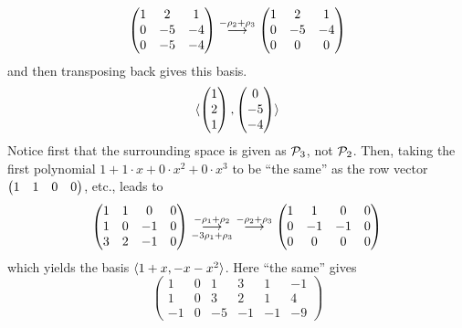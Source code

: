 \begin{exercises}
\begin{answer}
\begin{exparts}
\begin{equation*}
\begin{pmatrix}
               1  &2  &1  \\
               0  &-5 &-4 \\
               0  &-5 &-4
             \end{pmatrix}
             \grstep{-\rho_2+\rho_3}
             \begin{pmatrix}
               1  &2  &1  \\
               0  &-5 &-4 \\
               0  &0  &0
             \end{pmatrix}
          \end{equation*}
          and then transposing back gives this basis.
          \begin{equation*}
            \sequence{\colvec{1 \\ 2 \\ 1},
              \colvec{0 \\ -5 \\ -4}   }
          \end{equation*}
        \partsitem Notice first that the surrounding space is given as 
          $\polyspace_3$, not $\polyspace_2$. 
          Then, taking the first polynomial $1+1\cdot x+0\cdot x^2+0\cdot x^3$ 
          to be ``the same'' as the row vector $\rowvec{1 &1 &0 &0}$, etc., 
          leads to
          \begin{equation*}
            \begin{pmatrix}
              1  &1  &0  &0 \\
              1  &0  &-1 &0 \\
              3  &2  &-1 &0
            \end{pmatrix}
            \grstep[-3\rho_1+\rho_3]{-\rho_1+\rho_2}
            \;\grstep{-\rho_2+\rho_3}
            \begin{pmatrix}
              1  &1  &0  &0 \\
              0  &-1 &-1 &0 \\
              0  &0  &0  &0
            \end{pmatrix}
          \end{equation*}
          which yields the basis \( \sequence{1+x,-x-x^2} \).
        \partsitem Here ``the same'' gives
          \begin{equation*}
            \begin{pmatrix}
              1  &0  &1  &3  &1  &-1  \\
              1  &0  &3  &2  &1  &4   \\
             -1  &0  &-5  &-1 &-1 &-9

\end{pmatrix}
\end{equation*}
\end{exparts}
\end{answer}
\end{exercises}
